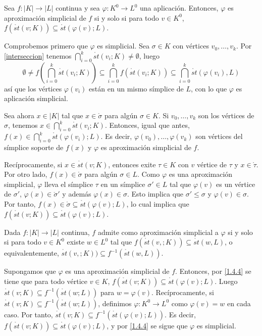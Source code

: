 \documentclass[HS.tex]{subfiles}
\begin{document}
\begin{prop}\label{1.4.4}
Sea $f:|K|\to|L|$ continua y sea $\varphi:K^0\to L^0$ una aplicación. Entonces, $\varphi$ es aproximación simplicial de $f$ si y solo si para todo $v\in K^0$, $f(\mathring{st}(v;K))\subseteq \mathring{st}(\varphi(v);L)$. 
\end{prop}
\begin{dem}
Comprobemos primero que $\varphi$ es simplicial. Sea $\sigma\in K$ con vértices $v_0,\dots, v_k$. Por \ref{interseccion} tenemos $\bigcap_{i=0}^k\mathring{st}(v_i;K)\neq\emptyset$, luego
\[
\emptyset\neq f\left(\bigcap_{i=0}^k\mathring{st}(v_i;K)\right)\subseteq \bigcap_{i=0}^k f\left(\mathring{st}(v_i;K)\right)\subseteq \bigcap_{i=0}^k\mathring{st}(\varphi(v_i),L)
\]
así que los vértices $\varphi(v_i)$ están en un mismo símplice de $L$, con lo que $\varphi$ es aplicación simplicial.

Sea ahora $x\in|K|$ tal que $x\in\mathring{\sigma}$ para algún $\sigma\in K$. Si $v_0,\dots, v_k$ son los vértices de $\sigma$, tenemos $x\in \bigcap_{i=0}^k\mathring{st}(v_i;K)$. Entonces, igual que antes, $f(x)\in \bigcap_{i=0}^k\mathring{st}(\varphi(v_i);L)$. Es decir, $\varphi(v_0),\dots, \varphi(v_k)$ son vértices del símplice soporte de $f(x)$ y $\varphi$ es aproximación simplicial de $f$.

Recíprocamente, si $x\in\mathring{st}(v;K)$, entonces exite $\tau\in K$ con $v$ vértice de $\tau$ y $x\in\mathring{\tau}$. Por otro lado, $f(x)\in\mathring{\sigma}$ para algún $\sigma\in L$. Como $\varphi$ es una aproximación simplicial, $\varphi$ lleva el símplice $\tau$ en un símplice $\sigma'\in L$ tal que $\varphi(v)$ es un vértice de $\sigma'$, $\varphi(x)\in\mathring{\sigma}'$ y además $\varphi(x)\in\sigma$. Esto implica que $\sigma'\leq\sigma$ y $\varphi(v)\in\sigma$. Por tanto, $f(x)\in\mathring{\sigma}\subseteq\mathring{st}(\varphi(v);L)$, lo cual implica que $f(\mathring{st}(v;K))\subseteq \mathring{st}(\varphi(v);L)$.

  \QED
\end{dem}

\begin{coro}\label{aprox}
Dada $f:|K|\to|L|$ continua, $f$ admite como aproximación simplicial a $\varphi$ si y solo si para todo $v\in K^0$ existe $w\in L^0$ tal que $f(\mathring{st}(v,;K))\subseteq \mathring{st}(w,L)$, o equivalentemente, $\mathring{st}(v,;K))\subseteq f^{-1}(\mathring{st}(w,L))$. 
\end{coro}
\begin{dem}
Supongamos que $\varphi$ es una aproximación simplicial de $f$. Entonces, por \ref{1.4.4} se tiene que para todo vértice $v\in K$, $f(\mathring{st}(v;K))\subseteq\mathring{st}(\varphi(v);L)$. Luego $\mathring{st}(v;K)\subseteq f^{-1}(\mathring{st}(w;L))$ para $w=\varphi(v)$.  Recíprocamente, si $\mathring{st}(v;K)\subseteq f^{-1}(\mathring{st}(w;L))$, definimos $\varphi:K^0\to L^0$ como $\varphi(v)=w$ en cada caso. Por tanto, $\mathring{st}(v;K)\subseteq f^{-1}(\mathring{st}(\varphi(v);L))$. Es decir, $f(\mathring{st}(v;K))\subseteq \mathring{st}(\varphi(v);L)$, y por \ref{1.4.4} se sigue que $\varphi$ es simplicial. \QED
\end{dem}
\end{document}
